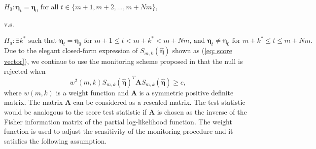 \documentclass{article}
\theoremstyle{definition}
\begin{document}
$H_0: \bm{\eta}_t = \bm{\eta}_0 \text{ for all }t \in \{m+1,m+2,...,m+Nm\},$ 

 v.s.  
 
$H_a: \exists k^*\text{ such that } \bm{\eta}_t = \bm{\eta}_0 \text{ for } m+1\leq t< m+k^* <m+Nm \text{, and }\bm{\eta}_t \neq \bm{\eta}_0 \text{ for } m+k^*\leq t\leq m+Nm.$
\\
Due to the elegant closed-form expression of $S_{m,k}(\hat{\bm{\eta}})$ shown as (\ref{eq: score vector}), we continue to use the monitoring scheme proposed in \cite{kirch2015use} that the null is rejected when 
\begin{equation}
\label{equation: test statistic}
    w^2(m,k)S_{m,k}(\hat{\bm{\eta}})^T\bm{A}S_{m,k}(\hat{\bm{\eta}}) \geq c,
\end{equation}
where $w(m,k)$ is a weight function and $\bm{A}$ is a symmetric positive definite matrix. The matrix $\bm{A}$ can be considered as a rescaled matrix. The test statistic would be analogous to the score test statistic if $\bm{A}$ is chosen as the inverse of the Fisher information matrix of the partial log-likelihood function. The weight function is used to adjust the sensitivity of the monitoring procedure and it satisfies the following assumption. 
\end{document}
